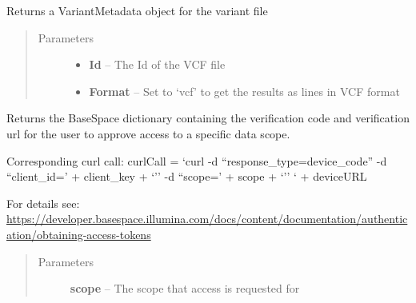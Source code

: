 \documentclass[letterpaper,10pt,english]{sphinxmanual}
\begin{document}
\begin{fulllineitems}
\begin{fulllineitems}
\begin{quote}
\begin{description}
\end{description}\end{quote}

\end{fulllineitems}


\begin{fulllineitems}
\label{Available modules:BaseSpacePy.api.BaseSpaceAPI.BaseSpaceAPI.getVariantMetadata}
Returns a VariantMetadata object for the variant file
\begin{quote}\begin{description}
\item[{Parameters}] \leavevmode\begin{itemize}
\item {} 
\textbf{Id} -- The Id of the VCF file

\item {} 
\textbf{Format} -- Set to `vcf' to get the results as lines in VCF format

\end{itemize}

\end{description}\end{quote}

\end{fulllineitems}


\begin{fulllineitems}
\label{Available modules:BaseSpacePy.api.BaseSpaceAPI.BaseSpaceAPI.getVerificationCode}
Returns the BaseSpace dictionary containing the verification code and verification url for the user to approve
access to a specific data scope.

Corresponding curl call:
curlCall = `curl -d ``response\_type=device\_code'' -d ``client\_id=' + client\_key + `'' -d ``scope=' + scope + `'' ` + deviceURL

For details see:
\href{https://developer.basespace.illumina.com/docs/content/documentation/authentication/obtaining-access-tokens}{https://developer.basespace.illumina.com/docs/content/documentation/authentication/obtaining-access-tokens}
\begin{quote}\begin{description}
\item[{Parameters}] \leavevmode
\textbf{scope} -- The scope that access is requested for


\end{description}
\end{quote}
\end{fulllineitems}
\end{fulllineitems}
\end{document}
